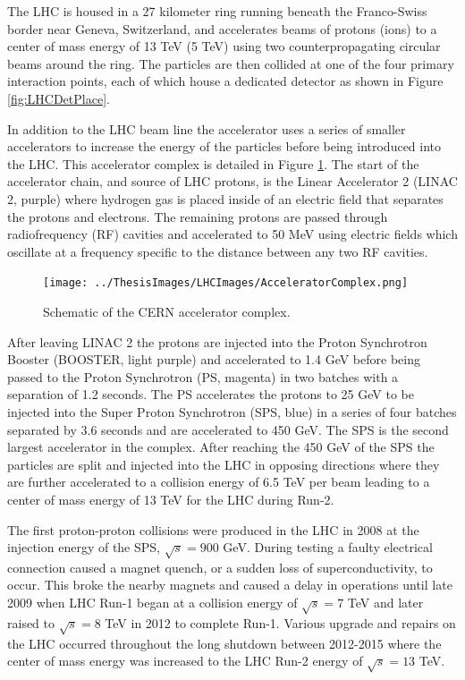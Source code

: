 The LHC is housed in a 27 kilometer ring running beneath the Franco-Swiss border near Geneva, Switzerland, and accelerates beams of protons (ions) to a center of mass energy of 13 TeV (5 TeV) using two counterpropagating circular beams around the ring.  The particles are then collided at one of the four primary interaction points, each of which house a dedicated detector as shown in Figure \ref{fig:LHCDetPlace}. 

In addition to the LHC beam line the accelerator uses a series of smaller accelerators to increase the energy of the particles before being introduced into the LHC.  This accelerator complex is detailed in Figure \ref{fig:AcceleratorMap}.  The start of the accelerator chain, and source of LHC protons, is the Linear Accelerator 2 (LINAC 2, purple) where hydrogen gas is placed inside of an electric field that separates the protons and electrons.  The remaining protons are passed through radiofrequency (RF) cavities and accelerated to 50 MeV using electric fields which oscillate at a frequency specific to the distance between any two RF cavities.
\begin{figure}[ht!]
	\centering
	\texttt{[image: ../ThesisImages/LHCImages/AcceleratorComplex.png]}
	\caption[Schematic of the CERN accelerator complex.]{Schematic of the CERN accelerator complex\cite{LHCAccComplex}.
	}
	\label{fig:AcceleratorMap}
\end{figure}

After leaving LINAC 2 the protons are injected into the Proton Synchrotron Booster (BOOSTER, light purple) and accelerated to 1.4 GeV before being passed to the Proton Synchrotron (PS, magenta) in two batches with a separation of 1.2 seconds.  The PS accelerates the protons to 25 GeV to be injected into the Super Proton Synchrotron (SPS, blue) in a series of four batches separated by 3.6 seconds and are accelerated to 450 GeV.  The SPS is the second largest accelerator in the complex.  After reaching the 450 GeV of the SPS the particles are split and injected into the LHC in opposing directions where they are further accelerated to a collision energy of 6.5 TeV per beam leading to a center of mass energy of 13 TeV for the LHC during Run-2.

The first proton-proton collisions were produced in the LHC in 2008 at the injection energy of the SPS, $\sqrt{s} =900$ GeV.  During testing a faulty electrical connection caused a magnet quench, or a sudden loss of superconductivity, to occur.  This broke the nearby magnets and caused a delay in operations until late 2009 when LHC Run-1 began at a collision energy of $\sqrt{s} = 7$ TeV and later raised to $\sqrt{s}=8$ TeV in 2012 to complete Run-1.  Various upgrade and repairs on the LHC occurred throughout the long shutdown between 2012-2015 where the center of mass energy was increased to the LHC Run-2 energy of $\sqrt{s} = 13$ TeV.

